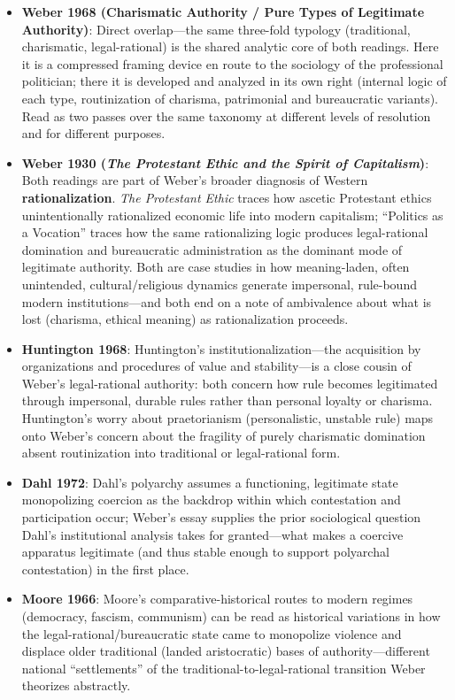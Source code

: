 \documentclass[12pt]{article}
\begin{document}
\begin{itemize}[leftmargin=*, itemsep=4pt]
    \item \textbf{Weber 1968 (Charismatic Authority / Pure Types of Legitimate Authority)}: Direct overlap---the same three-fold typology (traditional, charismatic, legal-rational) is the shared analytic core of both readings. Here it is a compressed framing device en route to the sociology of the professional politician; there it is developed and analyzed in its own right (internal logic of each type, routinization of charisma, patrimonial and bureaucratic variants). Read as two passes over the same taxonomy at different levels of resolution and for different purposes.
    \item \textbf{Weber 1930 (\textit{The Protestant Ethic and the Spirit of Capitalism})}: Both readings are part of Weber's broader diagnosis of Western \textbf{rationalization}. \textit{The Protestant Ethic} traces how ascetic Protestant ethics unintentionally rationalized economic life into modern capitalism; ``Politics as a Vocation'' traces how the same rationalizing logic produces legal-rational domination and bureaucratic administration as the dominant mode of legitimate authority. Both are case studies in how meaning-laden, often unintended, cultural/religious dynamics generate impersonal, rule-bound modern institutions---and both end on a note of ambivalence about what is lost (charisma, ethical meaning) as rationalization proceeds.
    \item \textbf{Huntington 1968}: Huntington's institutionalization---the acquisition by organizations and procedures of value and stability---is a close cousin of Weber's legal-rational authority: both concern how rule becomes legitimated through impersonal, durable rules rather than personal loyalty or charisma. Huntington's worry about praetorianism (personalistic, unstable rule) maps onto Weber's concern about the fragility of purely charismatic domination absent routinization into traditional or legal-rational form.
    \item \textbf{Dahl 1972}: Dahl's polyarchy assumes a functioning, legitimate state monopolizing coercion as the backdrop within which contestation and participation occur; Weber's essay supplies the prior sociological question Dahl's institutional analysis takes for granted---what makes a coercive apparatus legitimate (and thus stable enough to support polyarchal contestation) in the first place.
    \item \textbf{Moore 1966}: Moore's comparative-historical routes to modern regimes (democracy, fascism, communism) can be read as historical variations in how the legal-rational/bureaucratic state came to monopolize violence and displace older traditional (landed aristocratic) bases of authority---different national ``settlements'' of the traditional-to-legal-rational transition Weber theorizes abstractly.

\end{itemize}
\end{document}
